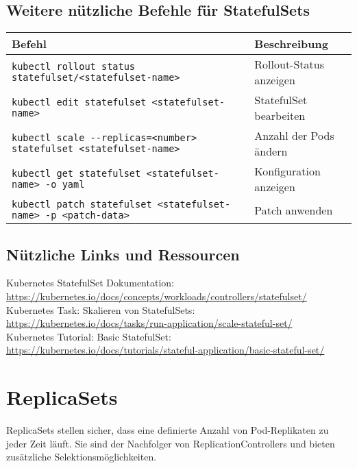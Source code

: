 \subsection{Weitere nützliche Befehle für StatefulSets}
\begin{tabular}{|p{}|p{}|}
\hline
\textbf{Befehl} & \textbf{Beschreibung} \\
\hline
\texttt{kubectl rollout status statefulset/<statefulset-name>} & Rollout-Status anzeigen \\
\texttt{kubectl edit statefulset <statefulset-name>} & StatefulSet bearbeiten \\
\texttt{kubectl scale {-}{-}replicas=<number> statefulset <statefulset-name>} & Anzahl der Pods ändern \\
\texttt{kubectl get statefulset <statefulset-name> -o yaml} & Konfiguration anzeigen \\
\texttt{kubectl patch statefulset <statefulset-name> -p <patch-data>} & Patch anwenden \\
\hline
\end{tabular}

\subsection{Nützliche Links und Ressourcen}
Kubernetes StatefulSet Dokumentation:\\
\url{https://kubernetes.io/docs/concepts/workloads/controllers/statefulset/}\\
Kubernetes Task: Skalieren von StatefulSets:\\
\url{https://kubernetes.io/docs/tasks/run-application/scale-stateful-set/}\\
Kubernetes Tutorial: Basic StatefulSet:\\
\url{https://kubernetes.io/docs/tutorials/stateful-application/basic-stateful-set/}\\



\section{ReplicaSets}
ReplicaSets stellen sicher, dass eine definierte Anzahl von Pod-Replikaten zu jeder Zeit läuft. Sie sind der Nachfolger von ReplicationControllers und bieten zusätzliche Selektionsmöglichkeiten. \\

